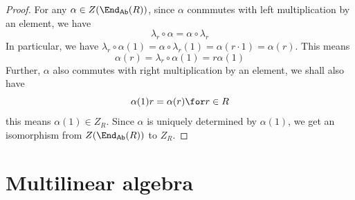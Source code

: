 \begin{proof}
For any $\alpha\in Z(\End_{\mathsf{Ab}}(R))$, since $\alpha$ conmmutes with left multiplication by an element, we have
\[\lambda_r\circ\alpha=\alpha\circ\lambda_r\]
In particular, we have $\lambda_r\circ\alpha(1)=\alpha\circ\lambda_r(1)=\alpha(r\cdot 1)=\alpha(r)$. This means
\[\alpha(r)=\lambda_r\circ\alpha(1)=r\alpha(1)\]
Further, $\alpha$ also commutes with right multiplication by an element, we shall also have
\[\alpha(1)r=\alpha(r)\for r\in R\]
this means $\alpha(1)\in Z_R$. Since $\alpha$ is uniquely determined by $\alpha(1)$, we get an isomorphism from $Z(\End_{\mathsf{Ab}}(R))$ to $Z_R$.
\end{proof}
\section{Multilinear algebra}
